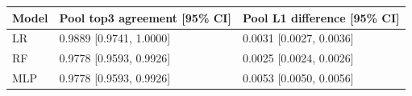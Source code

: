 \begingroup\footnotesize\setlength{\tabcolsep}{3pt}
\begin{tabular}{lll}
\toprule
Model & Pool top3 agreement [95\% CI] & Pool L1 difference [95\% CI] \\
\midrule
LR & 0.9889 [0.9741, 1.0000] & 0.0031 [0.0027, 0.0036] \\
RF & 0.9778 [0.9593, 0.9926] & 0.0025 [0.0024, 0.0026] \\
MLP & 0.9778 [0.9593, 0.9926] & 0.0053 [0.0050, 0.0056] \\
\bottomrule
\end{tabular}
\endgroup

